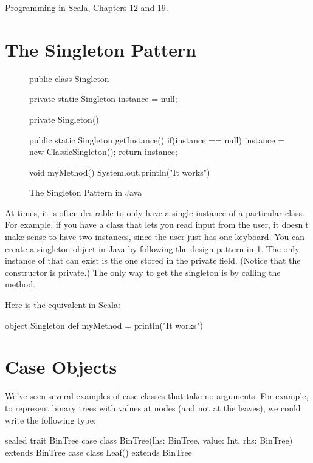 \documentclass{book}
\begin{document}
Programming in Scala, Chapters 12 and 19.

\section{The Singleton Pattern}

\begin{figure}
\begin{javacode}
public class Singleton {
  private static Singleton instance = null;

  private Singleton() { }

  public static Singleton getInstance() {
    if(instance == null) {
      instance = new ClassicSingleton();
    }
    return instance;
  }

  void myMethod() {
    System.out.println("It works")
  }

}
\end{javacode}
\caption{The Singleton Pattern in Java}
\label{javasingleton}
\end{figure}

At times, it is often desirable to only have a single instance of a particular
class. For example, if you have a class that lets you read input from the
user, it doesn't make sense to have two instances, since the user just has
one keyboard. You can create a singleton object in Java by following the
design pattern in \cref{javasingleton}. The only instance of 
that can exist is the one stored in the private field. (Notice that the constructor
is private.) The only way to get
the singleton is by calling the  method.

Here is the equivalent in Scala:

\begin{scalacode}
object Singleton {
  def myMethod = println("It works")
}
\end{scalacode}

\section{Case Objects}

We've seen several examples of case classes that take no arguments. For example,
to represent binary trees with values at nodes (and not at the leaves), we could
write the following type:
%
\begin{scalacode}
sealed trait BinTree
case class BinTree(lhs: BinTree, value: Int, rhs: BinTree) extends BinTree
case class Leaf() extends BinTree
\end{scalacode}
\end{document}
